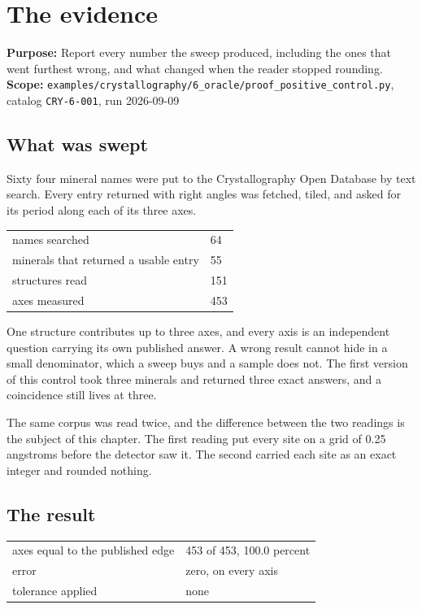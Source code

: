 \chapter{The evidence}

\textbf{Purpose:} Report every number the sweep produced, including the ones that went furthest wrong, and what changed when the reader stopped rounding.
\textbf{Scope:} \texttt{examples/\allowbreak{}crystallography/\allowbreak{}6\_\allowbreak{}oracle/\allowbreak{}proof\_\allowbreak{}positive\_\allowbreak{}control.\allowbreak{}py}, catalog \texttt{CRY-6-001}, run 2026-09-09

\section{What was swept}

Sixty four mineral names were put to the Crystallography Open Database by text search. Every entry returned with right angles was fetched, tiled, and asked for its period along each of its three axes.

\begin{longtable}{@{}p{}p{}@{}}
\toprule
\endhead
names searched & 64 \\
minerals that returned a usable entry & 55 \\
structures read & 151 \\
axes measured & 453 \\
\bottomrule
\end{longtable}

One structure contributes up to three axes, and every axis is an independent question carrying its own published answer. A wrong result cannot hide in a small denominator, which a sweep buys and a sample does not. The first version of this control took three minerals and returned three exact answers, and a coincidence still lives at three.

The same corpus was read twice, and the difference between the two readings is the subject of this chapter. The first reading put every site on a grid of 0.25 angstroms before the detector saw it. The second carried each site as an exact integer and rounded nothing.

\section{The result}

\begin{longtable}{@{}p{}p{}@{}}
\toprule
\endhead
axes equal to the published edge & 453 of 453, 100.0 percent \\
error & zero, on every axis \\
tolerance applied & none \\
\bottomrule
\end{longtable}

